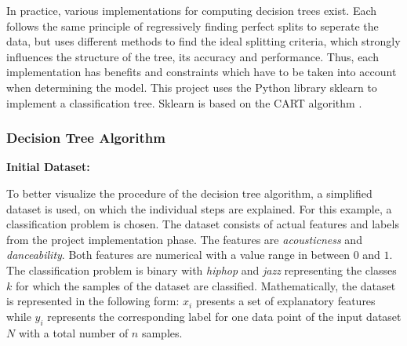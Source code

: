 
In practice, various implementations for computing decision trees exist. Each follows the same 
principle of regressively finding perfect splits to seperate the data, but uses different methods to find 
the ideal splitting criteria, which strongly influences the structure of the tree, its accuracy and 
performance. Thus, each implementation has benefits and constraints which have to be taken into account
when determining the model. This project uses the Python library sklearn to implement a classification tree. 
Sklearn is based on the \ac{CART} algorithm \cite{scikit-decision_tree}.


\subsubsection{Decision Tree Algorithm}

\textbf{Initial Dataset:}

To better visualize the procedure of the decision tree algorithm, a simplified dataset is used, 
on which the individual steps are explained. For this example, a classification problem is chosen. 
The dataset consists of actual features and labels from the project implementation phase. The 
features are \emph{acousticness} and \emph{danceability}. Both features are numerical with a value range 
in between \(0\) and \(1\). The classification problem is binary with \emph{hiphop} and \emph{jazz} representing 
the classes \(k\) for which the samples of the dataset are classified. Mathematically, the dataset 
is represented in the following form: \(x_{i}\) presents a set of explanatory features while \(y_{i}\) represents 
the corresponding label for one data point of the input dataset \(N\) with a total number of \(n\) 
samples.

